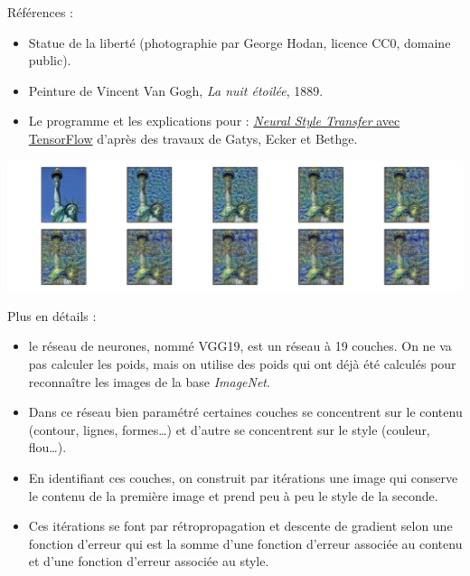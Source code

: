 \documentclass[11pt,class=report,crop=false]{standalone}
\begin{document}
Références :
\begin{itemize}
  \item Statue de la liberté (photographie par George Hodan, licence CC0, domaine public).
  \item Peinture de Vincent Van Gogh, \emph{La nuit étoilée}, 1889.
  \item Le programme et les explications pour \tensorflow{} :  \href{https://github.com/tensorflow/models/blob/master/research/nst_blogpost/4_Neural_Style_Transfer_with_Eager_Execution.ipynb}{\emph{Neural Style Transfer} avec TensorFlow} d'après des travaux de Gatys, Ecker et Bethge.
\end{itemize}

\begin{center}
\includegraphics[scale=\myscale,scale=0.5]{figures/iter_500it_256px.png}
\end{center}



Plus en détails :
\begin{itemize}
  \item le réseau de neurones, nommé \og{}VGG19\fg{}, est un réseau à 19 couches. 
  On ne va pas calculer les poids, mais on utilise des poids qui ont déjà été calculés pour reconnaître les images de la base \emph{ImageNet}.
  
  \item Dans ce réseau bien paramétré certaines couches se concentrent sur le contenu (contour, lignes, formes\ldots) et d'autre se concentrent sur le style (couleur, flou\ldots).
  
  \item En identifiant ces couches, on construit par itérations une image qui conserve le contenu de la première image et prend peu à peu le style de la seconde.
  
  \item Ces itérations se font par rétropropagation et descente de gradient selon une fonction d'erreur qui est la somme d'une fonction d'erreur associée au contenu et d'une fonction d'erreur associée au style.
 
\end{itemize}
\end{document}
